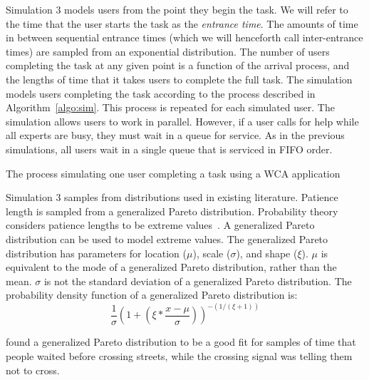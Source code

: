 Simulation 3 models users from the point they begin the task.
We will refer to the time that the user starts the task as the
\emph{entrance time}.
The amounts of time in between sequential entrance times (which we will
henceforth call inter-entrance times) are sampled from an exponential
distribution.
The number of users completing the task at any given point is a function of the
arrival process, and the lengths of time that it takes users to complete the
full task.
The simulation models users completing the task according to the process
described in Algorithm~\ref{algo:sim}.
This process is repeated for each simulated user.
The simulation allows users to work in parallel.
However, if a user calls for help while all experts are busy, they must wait in
a queue for service.
As in the previous simulations, all users wait in a single queue that is
serviced in FIFO order.

\begin{algorithm}[h]
  \caption{
    The process simulating one user completing a task using a WCA application
  }\label{algo:sim}
\end{algorithm}

Simulation 3 samples from distributions used in existing literature.
Patience length is sampled from a generalized Pareto distribution.
Probability theory considers patience lengths to be extreme
values~\cite{patience}.
A generalized Pareto distribution can be used to model extreme values.
The generalized Pareto distribution has parameters for location ($\mu$), scale
($\sigma$), and shape ($\xi$).
$\mu$ is equivalent to the mode of a generalized Pareto distribution, rather than
the mean.
$\sigma$ is not the standard deviation of a generalized Pareto distribution.
The probability density function of a generalized Pareto distribution is:
\[
  \frac{1}{\sigma} \left(1 + \left(\xi * \frac{x - \mu}{\sigma}\right)
  \right)^{-(1/(\xi + 1))}
\]


\citet{patience} found a generalized Pareto distribution to be a good fit for
samples of time that people waited before crossing streets, while the crossing
signal was telling them not to cross.

